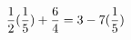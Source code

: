 \documentclass[preview]{standalone}
\begin{document}
\begin{align*}
\special{dvisvgm:raw <g id='unique000'>}\frac{1}{2} (\frac{1}{5}) + \frac{6}{4} = 3 - 7(\frac{1}{5})\special{dvisvgm:raw </g>}
\end{align*}
\end{document}
